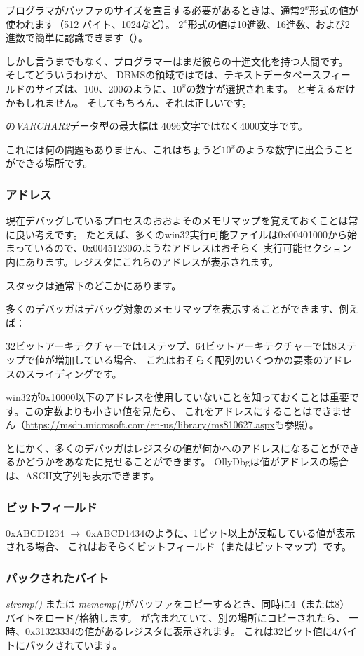 プログラマがバッファのサイズを宣言する必要があるときは、通常$2^x$形式の値が使われます（512 バイト、1024など）。
$2^x$形式の値は10進数、16進数、および2進数で簡単に認識できます（）。

しかし言うまでもなく、プログラマーはまだ彼らの十進文化を持つ人間です。 
そしてどういうわけか、 \ac{DBMS}の領域ではでは、テキストデータベースフィールドのサイズは、100、200のように、$10^x$の数字が選択されます。 
と考えるだけかもしれません。
そしてもちろん、それは正しいです。 

\oracle の\emph{VARCHAR2}データ型の最大幅は 4096文字ではなく4000文字です。

これには何の問題もありません、これはちょうど$10^x$のような数字に出会うことができる場所です。

\subsubsection{アドレス}

現在デバッグしているプロセスのおおよそのメモリマップを覚えておくことは常に良い考えです。
たとえば、多くのwin32実行可能ファイルは0x00401000から始まっているので、0x00451230のようなアドレスはおそらく
実行可能セクション内にあります。レジスタにこれらのアドレスが表示されます。 

スタックは通常下のどこかにあります。 %

多くのデバッガはデバッグ対象のメモリマップを表示することができます、例えば：

32ビットアーキテクチャーでは4ステップ、64ビットアーキテクチャーでは8ステップで値が増加している場合、
これはおそらく配列のいくつかの要素のアドレスのスライディングです。

win32が0x10000以下のアドレスを使用していないことを知っておくことは重要です。この定数よりも小さい値を見たら、
これをアドレスにすることはできません（\url{https://msdn.microsoft.com/en-us/library/ms810627.aspx}も参照）。

とにかく、多くのデバッガはレジスタの値が何かへのアドレスになることができるかどうかをあなたに見せることができます。 
OllyDbgは値がアドレスの場合は、ASCII文字列も表示できます。

\subsubsection{ビットフィールド}

0xABCD1234 $\rightarrow$ 0xABCD1434のように、1ビット以上が反転している値が表示される場合、
これはおそらくビットフィールド（またはビットマップ）です。

\subsubsection{パックされたバイト}

\emph{strcmp()} または \emph{memcmp()}がバッファをコピーするとき、同時に4（または8）バイトをロード/格納します。
が含まれていて、別の場所にコピーされたら、
一時、0x31323334の値があるレジスタに表示されます。
これは32ビット値に4バイトにパックされています。
